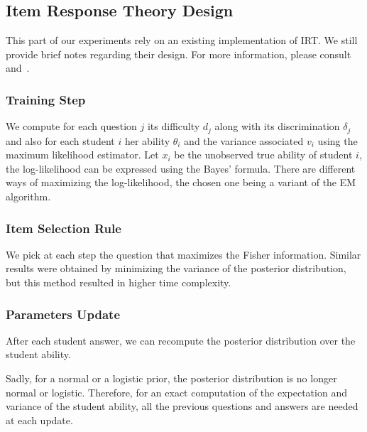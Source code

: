 \documentclass{sig-alternate}
\begin{document}

\subsection{Item Response Theory Design}

This part of our experiments rely on an existing implementation of IRT. We still provide brief notes regarding their design. For more information, please consult \citep{Rizopoulos2006} and~\citep{MagisRaiche2012}.

\subsubsection{Training Step}

We compute for each question $j$ its difficulty $d_j$ along with its discrimination $\delta_j$ and also for each student $i$ her ability $\theta_i$ and the variance associated $v_i$ using the maximum likelihood estimator. Let $x_i$ be the unobserved true ability of student $i$, the log-likelihood can be expressed using the Bayes' formula. There are different ways of maximizing the log-likelihood, the chosen one being a variant of the EM algorithm.

\subsubsection{Item Selection Rule}

We pick at each step the question that maximizes the Fisher information. Similar results were obtained by minimizing the variance of the posterior distribution, but this method resulted in higher time complexity.

\subsubsection{Parameters Update}

After each student answer, we can recompute the posterior distribution over the student ability.

Sadly, for a normal or a logistic prior, the posterior distribution is no longer normal or logistic. Therefore, for an exact computation of the expectation and variance of the student ability, all the previous questions and answers are needed at each update.
\end{document}
